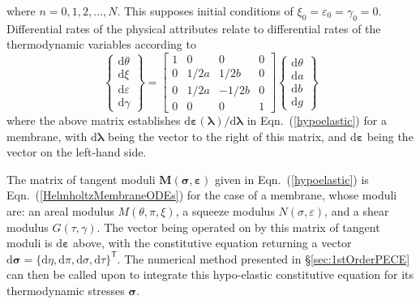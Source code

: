 where $n = 0 , 1 , 2 , \ldots , N$.  This supposes initial conditions of $\xi_0 = \varepsilon_0 = \gamma_0 = 0$.  Differential rates of the physical attributes relate to differential rates of the thermo\-dynamic variables according to 
\begin{equation}
    \left\{ \begin{matrix}
    \mathrm{d} \theta \\ \mathrm{d} \xi \\
    \mathrm{d} \varepsilon \\ \mathrm{d} \gamma
    \end{matrix} \right\} = \begin{bmatrix}
    1 & 0 & 0 & 0 \\
    0 & 1/2a & 1/2b & 0 \\
    0 & 1/2a & -1/2b & 0 \\
    0 & 0 & 0 & 1
    \end{bmatrix} \left\{ \begin{matrix} 
    \mathrm{d} \theta \\ \mathrm{d} a \\
    \mathrm{d} b \\ \mathrm{d} g
    \end{matrix} \right\}
\end{equation}
where the above matrix establishes $\mathrm{d} \boldsymbol{\varepsilon} ( \boldsymbol{\lambda} ) / \mathrm{d} \boldsymbol{\lambda}$ in Eqn.~(\ref{hypoelastic}) for a membrane, with $\mathrm{d} \boldsymbol{\lambda}$ being the vector to the right of this matrix, and $\mathrm{d} \boldsymbol{\varepsilon}$ being the vector on the left-hand side.

The matrix of tangent moduli $\mathbf{M} ( \boldsymbol{\sigma} , \boldsymbol{\varepsilon} )$ given in Eqn.~(\ref{hypoelastic}) is Eqn.~(\ref{HelmholtzMembraneODEs}) for the case of a membrane, whose moduli are: an areal modulus $M(\theta , \pi , \xi)$, a squeeze modulus $N( \sigma , \varepsilon )$, and a shear modulus $G( \tau , \gamma )$.  The vector being operated on by this matrix of tangent moduli is $\mathrm{d} \boldsymbol{\varepsilon}$ above, with the constitutive equation returning a vector $\mathrm{d} \boldsymbol{\sigma} = \{ \mathrm{d} \eta , \mathrm{d} \pi , \mathrm{d} \sigma , \mathrm{d} \tau \}^{\mathsf{T}}$.  The numerical method presented in \S\ref{sec:1stOrderPECE} can then be called upon to integrate this hypo-elastic constitutive equation for its thermo\-dynamic stresses $\boldsymbol{\sigma}$.  

